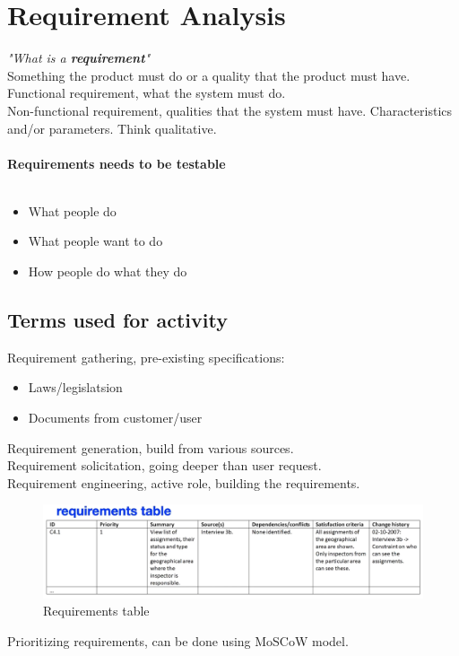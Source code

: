 \chapter{Requirement Analysis}\label{chp:requirement_analysis}
\textit{"What is a \textbf{requirement}"}\\
Something the product must do or a quality that the product must have.\\
Functional requirement, what the system must do.\\
Non-functional requirement, qualities that the system must have. Characteristics and/or parameters. Think qualitative.\\\\
\textbf{Requirements needs to be testable}
\\\\
\begin{itemize}
    \item What people do
    \item What people want to do
    \item How people do what they do
\end{itemize}

\section{Terms used for activity}
Requirement gathering, pre-existing specifications:
\begin{itemize}
    \item Laws/legislatsion
    \item Documents from customer/user
\end{itemize}
Requirement generation, build from various sources.\\
Requirement solicitation, going deeper than user request.\\
Requirement engineering, active role, building the requirements.

\begin{figure}[H]
    \begin{center}
        \includegraphics*[width=\linewidth*3/4]{chapters/requirement_analysis/figures/requirement_table.png}        
    \end{center}
    \caption{Requirements table}
    \label{fig:requirement_table}
\end{figure}

Prioritizing requirements, can be done using MoSCoW model.